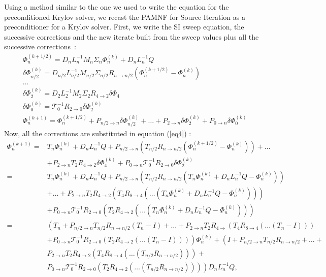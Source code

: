 \documentclass[preprint,10pt]{elsarticle}
\renewcommand{\(}{\left(}
\renewcommand{\)}{\right)}
\renewcommand{\[}{\left[}
\renewcommand{\]}{\right]}
\begin{document}
Using a method similar to the one we used to write the equation for the 
preconditioned Krylov solver, we recast the PAMNF for Source Iteration as a
preconditioner for a Krylov solver. First, we write the SI sweep equation, the
successive corrections and the new iterate built from the sweep values plus all
the successive \hbox{corrections :}
\begin{align}
& \Phi_n^{(k+1/2)} = D_n L_n^{-1} M_n \Sigma_n \Phi_n^{(k)} + D_n L_n^{-1} Q
\label{eq1}\\
& \delta \Phi_{n/2}^{(k)} = D_{n/2} L_{n/2}^{-1} M_{n/2} \Sigma_{n/2}
R_{n\rightarrow n/2} \(\Phi_n^{(k+1/2)}-\Phi_n^{(k)}\) \label{eq2}\\
& \hdots\\
& \delta \Phi_2^{(k)} = D_2 L_2^{-1} M_2 \Sigma_2 R_{4\rightarrow 2} \delta \Phi_4\\
& \delta \Phi_0^{(k)} = \mathcal{T}_0^{-1} R_{2\rightarrow 0} \delta
\Phi_2^{(k)} \label{eq3}\\
& \Phi_n^{(k+1)} = \Phi_n^{(k+1/2)} + P_{n/2 \rightarrow n} \delta
\Phi_{n/2}^{(k)} + \hdots + P_{2 \rightarrow n} \delta \Phi_{2}^{(k)} + P_{0
\rightarrow n} \delta \Phi_{0}^{(k)}\label{eq4}
\end{align}
Now, all the corrections are substituted in equation (\ref{eq4}) :
\begin{equation}
\begin{split}
\Phi_n^{(k+1)} =& T_n \Phi_n^{(k)} + D_n L_n^{-1} Q +
P_{n/2 \rightarrow n} \(T_{n/2}
R_{n\rightarrow n/2} \(\Phi_n^{(k+1/2)} - \Phi_n^{(k)}\)\)+\hdots \\
&+ P_{2 \rightarrow n} T_2 R_{4\rightarrow 2} \delta
\Phi_{4}^{(k)} + P_{0\rightarrow n} \mathcal{T}_0^{-1} R_{2\rightarrow 0} \delta 
\Phi_2^{(k)}\\
=& T_n \Phi_n^{(k)} + D_n L_n^{-1} Q + P_{n/2 \rightarrow
n} \(T_{n/2} R_{n \rightarrow n/2}\(T_n \Phi_n^{(k)} +D_n L_n^{-1} Q -\Phi_n^{(k)}
\)\)\\
& +\hdots + P_{2\rightarrow n} T_2 R_{4\rightarrow 2} 
\(T_4 R_{8\rightarrow 4}\( \hdots \(T_n \Phi_n^{(k)} + D_n L_n^{-1} Q -
 \Phi_n^{(k)}\)\) \) \\ 
&+ P_{0\rightarrow n} \mathcal{T}_0^{-1} R_{2\rightarrow 0}\(T_2 R_{4\rightarrow 2} 
\(\hdots\(T_n \Phi_n^{(k)}+D_n L_n^{-1}Q-\Phi_n^{(k)}\)\)\)\\
=& \(T_n + P_{n/2\rightarrow n} T_{n/2} R_{n\rightarrow n/2}\(T_n-I\)+
 \hdots + P_{2\rightarrow n} T_2 R_{4\rightarrow}
\(T_4 R_{8\rightarrow 4} \(\hdots\(T_n -I\)\)\)\right.\\ 
&\left. +P_{0\rightarrow n} \mathcal{T}_0^{-1} R_{2\rightarrow 0}  \(T_2
R_{4\rightarrow 2} (\hdots \(T_n-I\))\)\) \Phi_n^{(k)}
+\(I+P_{n/2\rightarrow n} T_{n/2} R_{n\rightarrow
n/2}+ \hdots + \right.\\
&\left. P_{2\rightarrow n} T_2 R_{4\rightarrow 2} \(T_4
 R_{8\rightarrow 4}\(\hdots
\(T_{n/2}R_{n\rightarrow n/2}\)\)\)+\right.\\
& \left. P_{0\rightarrow n} \mathcal{T}_0^{-1}R_{2\rightarrow 0}
\(T_2 R_{4\rightarrow 2}\(\hdots\(T_{n/2}R_{n\rightarrow n/2}\)\)\)\)
D_nL_n^{-1} Q ,
\end{split}
\end{equation}
\end{document}
